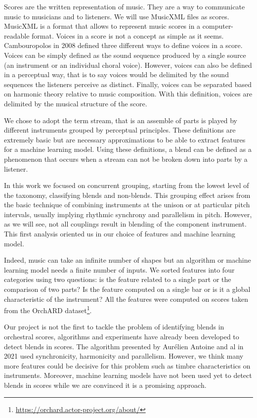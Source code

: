 \documentclass[11pt, a4paper]{article}
\begin{document}
Scores are the written representation of music. They are a way to communicate music to musicians and to listeners.
We will use MusicXML files as scores. MusicXML is a format that allows to represent music scores in a computer-readable format.
Voices in a score is not a concept as simple as it seems. Cambouropolos in 2008 defined three different ways to define voices in a score.
Voices can be simply defined as the sound sequence produced by a single source (an instrument or an individual choral voice).
However, voices can also be defined in a perceptual way, that is to say voices would be delimited by the sound sequences the listeners perceive as distinct.
Finally, voices can be separated based on harmonic theory relative to music composition.
With this definition, voices are delimited by the musical structure of the score\cite{vaswaniAttentionAllYou2023}.

We chose to adopt the term stream, that is an assemble of parts is played by different instruments grouped by perceptual principles.
These definitions are extremely basic but are necessary approximations to be able to extract features for a machine learning model.
Using these definitions, a blend can be defined as a phenomenon that occurs when a stream can not be broken down into parts by a listener.


In this work we focused on concurrent grouping, starting from the lowest level of the taxonomy, classifying blends and non-blends.
This grouping effect arises from the basic technique of combining instruments at the unison or at particular pitch intervals, usually implying rhythmic synchrony and parallelism in pitch.
However, as we will see, not all couplings result in blending of the component instrument.
This first analysis oriented us in our choice of features and machine learning model\cite{}.

Indeed, music can take an infinite number of shapes but an algorithm or machine learning model needs a finite number of inputs\cite{}.
We sorted features into four categories using two questions: is the feature related to a single part or the comparison of two parts?
Is the feature computed on a single bar or is it a global characteristic of the instrument?
All the features were computed on scores taken from the OrchARD dataset\footnote[1]{\url{https://orchard.actor-project.org/about/}}.


Our project is not the first to tackle the problem of identifying blends in orchestral scores, algorithms and experiments have already been developed to detect blends in scores.
The algorithm presented by Aurélien Antoine and al in 2021 used synchronicity, harmonicity and parallelism\cite{}.
However, we think many more features could be decisive for this problem such as timbre characteristics on instruments\cite{}.
Moreover, machine learning models have not been used yet to detect blends in scores while we are convinced it is a promising approach.
\end{document}
